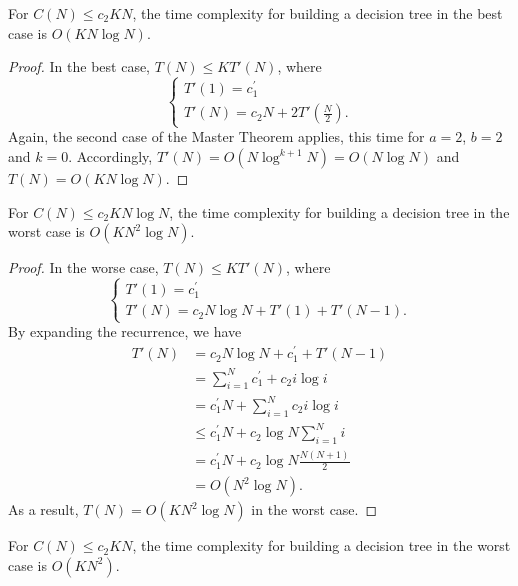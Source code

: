 \begin{theorem}\label{thm:6:best:kn}
For $C(N) \leq c_2 K N$, the time complexity for building a decision
tree in the best case is $O(K N \log N)$.
\end{theorem}

\begin{proof}
In the best case, $T(N) \leq K T'(N)$, where
\begin{equation}
\begin{cases}
T'(1) = c_1^\prime \\
T'(N) = c_2 N + 2 T'(\frac{N}{2}).
\end{cases}
\end{equation}
Again, the second case of the Master Theorem applies, this time for $a=2$, $b=2$ and $k=0$.
Accordingly, $T'(N)=O(N\log^{k+1} N)=O(N\log N)$ and $T(N) = O(K N\log N)$.
\end{proof}

\begin{theorem}\label{thm:6:worst:knlogn}
For $C(N)\leq c_2 K N\log N$, the time complexity for building a decision
tree in the worst case is $O(K N^2 \log N)$.
\end{theorem}

\begin{proof}
In the worse case, $T(N) \leq K T'(N)$, where
\begin{equation}
\begin{cases}
T'(1) = c_1^\prime \\
T'(N) = c_2 N \log N +  T'(1) + T'(N-1).
\end{cases}
\end{equation}
By expanding the recurrence, we have
\begin{align}
T'(N) &= c_2 N \log N + c_1^\prime + T'(N-1) \nonumber \\
      &= \sum_{i=1}^N c_1^\prime + c_2 i\log i \nonumber \\
      &= c_1^\prime N + \sum_{i=1}^N c_2 i\log i \nonumber \\
      &\leq c_1^\prime N + c_2 \log N \sum_{i=1}^N i \nonumber \\
      &= c_1^\prime N + c_2 \log N \frac{N(N+1)}{2} \nonumber \\
      &= O(N^2 \log N).
\end{align}
As a result, $T(N) = O(K N^2 \log N)$ in the worst case.
\end{proof}

\begin{theorem}\label{thm:6:worst:kn}
For $C(N)\leq c_2 K N$, the time complexity for building a decision
tree in the worst case is $O(K N^2)$.
\end{theorem}

